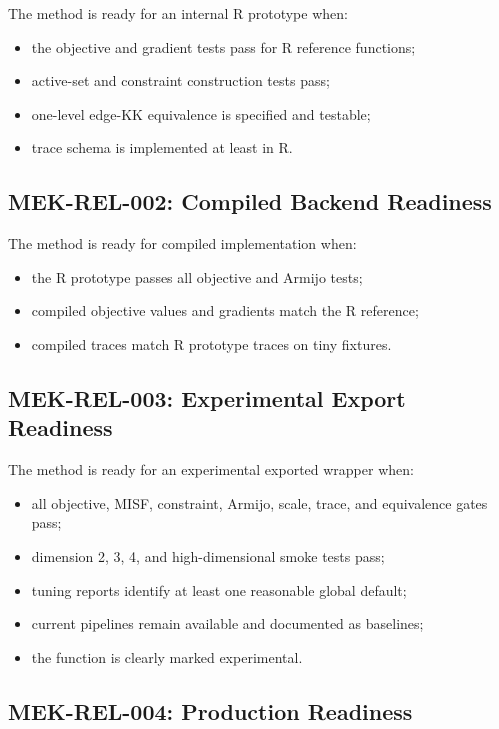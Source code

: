 \documentclass[11pt]{article}
\begin{document}
The method is ready for an internal R prototype when:
\begin{itemize}[leftmargin=2em]
  \item the objective and gradient tests pass for R reference functions;
  \item active-set and constraint construction tests pass;
  \item one-level edge-KK equivalence is specified and testable;
  \item trace schema is implemented at least in R.
\end{itemize}

\subsection{MEK-REL-002: Compiled Backend Readiness}

The method is ready for compiled implementation when:
\begin{itemize}[leftmargin=2em]
  \item the R prototype passes all objective and Armijo tests;
  \item compiled objective values and gradients match the R reference;
  \item compiled traces match R prototype traces on tiny fixtures.
\end{itemize}

\subsection{MEK-REL-003: Experimental Export Readiness}

The method is ready for an experimental exported wrapper when:
\begin{itemize}[leftmargin=2em]
  \item all objective, MISF, constraint, Armijo, scale, trace, and equivalence
  gates pass;
  \item dimension 2, 3, 4, and high-dimensional smoke tests pass;
  \item tuning reports identify at least one reasonable global default;
  \item current pipelines remain available and documented as baselines;
  \item the function is clearly marked experimental.
\end{itemize}

\subsection{MEK-REL-004: Production Readiness}
\end{document}
